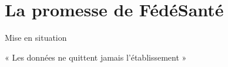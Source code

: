 \section{La promesse de FédéSanté}

\begin{frame}{Mise en situation}
\end{frame}

\begin{frame}{« Les données ne quittent jamais l'établissement »}
\end{frame}

